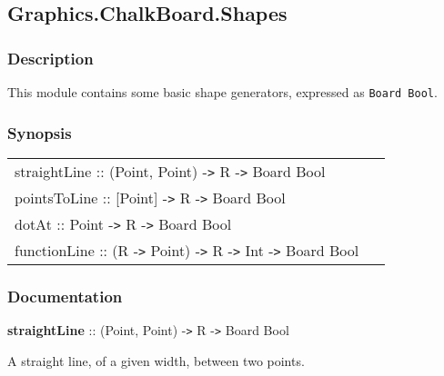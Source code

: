 \subsection{Graphics.ChalkBoard.Shapes}     

         

 

\subsubsection{Description}

\hspace{0.05\textwidth}\begin{minipage}{0.9\textwidth}This module contains some basic shape generators, expressed as {\tt Board Bool}.\end{minipage}

 

\subsubsection{Synopsis}

 

 
\begin{tabular}{p{0.95\linewidth}}{straightLine :: (Point, Point) -{\tt >} R -{\tt >} Board Bool}\\ %


{pointsToLine :: [Point] -{\tt >} R -{\tt >} Board Bool}\\ %


{dotAt :: Point -{\tt >} R -{\tt >} Board Bool}\\ %


{functionLine :: (R -{\tt >} Point) -{\tt >} R -{\tt >} Int -{\tt >} Board Bool}\\ %


\end{tabular}


 

\subsubsection{Documentation}

 

{{\bf straightLine} :: (Point, Point) -{\tt >} R -{\tt >} Board Bool}

\hspace{0.05\textwidth}\begin{minipage}{0.9\textwidth}A straight line, of a given width, between two points.\end{minipage}

